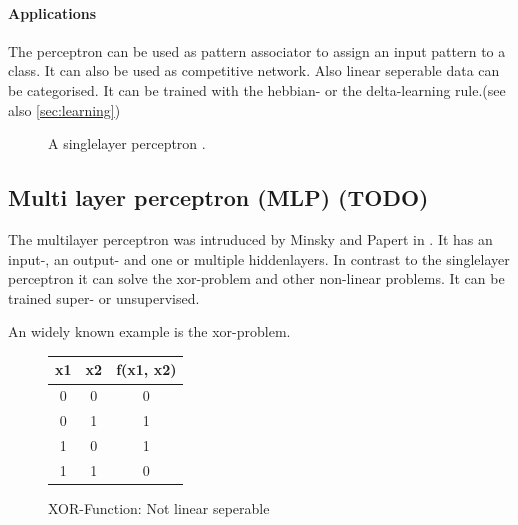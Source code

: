 \documentclass[10pt,a4paper,DIV=11]{scrreprt}
\begin{document}
\paragraph{Applications}
The perceptron can be used as pattern associator to assign an input pattern to a class. It can also be used as competitive network. Also linear seperable data can be categorised.
It can be trained with the hebbian- or the delta-learning rule.(see also \eqref{sec:learning})

\begin{center}
	\begin{figure}[H]
		\centering
		\caption{A singlelayer perceptron \cite{PERSIN}.}
		\label{fig:neuron}
	\end{figure}
\end{center}


\subsection{Multi layer perceptron (MLP) (TODO)} \label{sec:mlp}
The multilayer perceptron was intruduced by Minsky and Papert in . It has an input-, an output- and
one or multiple hiddenlayers. In contrast to the singlelayer perceptron it can solve the xor-problem and other non-linear problems. It can be trained super- or unsupervised.

An widely known example is the xor-problem.

\begin{figure}[H]
	\centering
	\begin{tabular}{|c|c|c|}
		\hline
		x1 & x2 & f(x1, x2)\\
		\hline
		0 & 0 & 0 \\
		\hline
		0 & 1 & 1 \\
		\hline
		1 & 0 & 1 \\
		\hline
		1 & 1 & 0 \\
		\hline
	\end{tabular}
	\caption{XOR-Function: Not linear seperable}
	\label{fig:nlinsep}

\end{figure}
\end{document}
